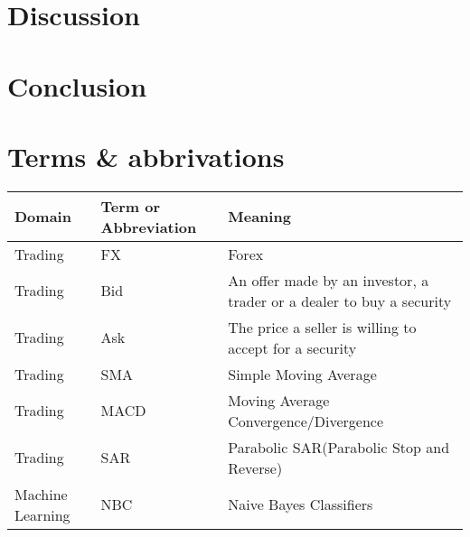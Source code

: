\documentclass[10pt]{IEEEtran}
\begin{document}
\section{Discussion}

\section{Conclusion}


\section{Terms \& abbrivations}
\begin{tabular}{l | l | l}
Domain & Term or Abbreviation &  Meaning  \\
\hline
Trading & FX & Forex \\ 
Trading & Bid & An offer made by an investor, a trader or a dealer to buy a security\\
Trading & Ask & The price a seller is willing to accept for a security\\
Trading & SMA & Simple Moving Average\\
Trading & MACD & Moving Average Convergence/Divergence\\
Trading & SAR & Parabolic SAR(Parabolic Stop and Reverse)\\
Machine Learning & NBC & Naive Bayes Classifiers\\
\end{tabular}





\end{document}
